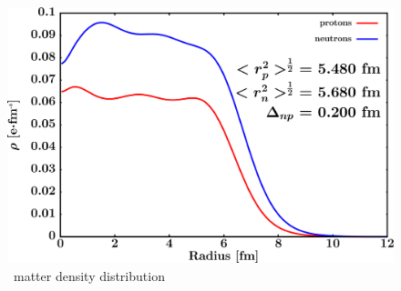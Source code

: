 \begin{figure}[hbtp]
    \centering
    \begin{minipage}{0.70\textwidth}
        \centering
        \includegraphics[width=\linewidth]{figures/pb208_matterDensity.png}
        \caption*{\pbEight\ matter density distribution}
        \label{DOMFitData_pb208_matterDensity}
    \end{minipage}
\end{figure}

